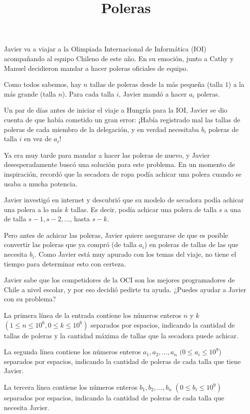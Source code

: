 \documentclass{oci}
\title{Poleras}
\begin{document}
\begin{problemDescription}
Javier va a viajar a la Olimpiada Internacional de Informática (IOI) acompañando al equipo Chileno de este año. En su emoción, junto a Cathy y Manuel
decidieron mandar a hacer poleras oficiales de equipo.

Como todos sabemos, hay $n$ tallas de poleras desde la más pequeña (talla $1$) a la más grande (talla $n$). Para cada talla $i$, Javier mandó
a hacer $a_i$ poleras.

Un par de días antes de iniciar el viaje a Hungría para la IOI, Javier se dio cuenta de que había cometido un gran error: ¡Había registrado
mal las tallas de poleras de cada miembro de la delegación, y en verdad necesitaba $b_i$ poleras de talla $i$ en vez de $a_i$!

Ya era muy tarde para mandar a hacer las poleras de nuevo, y Javier desesperadamente buscó una solución para este problema. En un momento de
inspiración, recordó que la secadora de ropa podía achicar una polera cuando se usaba a mucha potencia.

Javier investigó en internet y descubrió que su modelo de secadora podía achicar una polera a lo más $k$ tallas. Es decir, podía achicar una
polera de talla $s$ a una de talla $s-1, s-2, \dots$, hasta $s-k$.

Pero antes de achicar las poleras, Javier quiere asegurarse de que es posible convertir las poleras que ya compró (de talla $a_i$) en poleras de
tallas de las que necesita $b_i$. Como Javier está muy apurado con los temas del viaje, no tiene el tiempo para determinar esto con certeza.

Javier sabe que los competidores de la OCI son los mejores programadores de Chile a nivel escolar, y por eso decidió pedirte tu ayuda. ¿Puedes
ayudar a Javier con su problema?
\end{problemDescription}

\begin{inputDescription}
La primera línea de la entrada contiene los números enteros $n$ y $k$ $(1 \leq n \leq 10^6, 0 \leq k \leq 10^6)$ separados por espacios, indicando la
cantidad de tallas de poleras y la cantidad máxima de tallas que la secadora puede achicar.

La segunda línea contiene los números enteros $a_1, a_2, \dots, a_n$ $(0 \leq a_i \leq 10^9$) separados por espacios, indicando la cantidad de
poleras de cada talla que tiene Javier.

La tercera línea contiene los números enteros $b_1, b_2, \dots, b_n$ $(0 \leq b_i \leq 10^9)$ separados por espacios, indicando la cantidad de
poleras de cada talla que necesita Javier.
\end{inputDescription}
\end{document}
